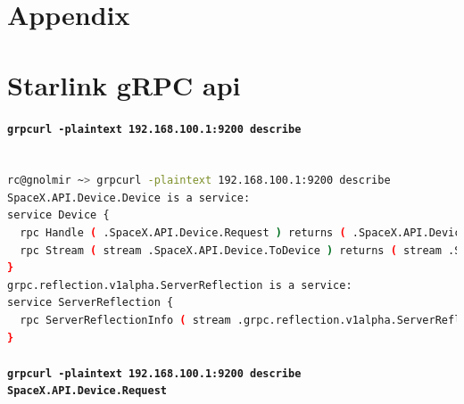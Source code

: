 \documentclass[IN,11pt,twoside,openright,idp,english]{tumthesis}
\begin{document}
\appendix
\chapter{Appendix}
\label{chap:appendix}


\chapter{Starlink gRPC api}
\label{starlink-grpc}

\subsubsection{\texttt{grpcurl -plaintext 192.168.100.1:9200 describe}}

\begin{lstlisting}[language=bash,basicstyle=\tiny]

rc@gnolmir ~> grpcurl -plaintext 192.168.100.1:9200 describe
SpaceX.API.Device.Device is a service:
service Device {
  rpc Handle ( .SpaceX.API.Device.Request ) returns ( .SpaceX.API.Device.Response );
  rpc Stream ( stream .SpaceX.API.Device.ToDevice ) returns ( stream .SpaceX.API.Device.FromDevice );
}
grpc.reflection.v1alpha.ServerReflection is a service:
service ServerReflection {
  rpc ServerReflectionInfo ( stream .grpc.reflection.v1alpha.ServerReflectionRequest ) returns ( stream .grpc.reflection.v1alpha.ServerReflectionResponse );
}
\end{lstlisting}
\subsubsection{\texttt{grpcurl -plaintext 192.168.100.1:9200 describe SpaceX.API.Device.Request}}
\end{document}
